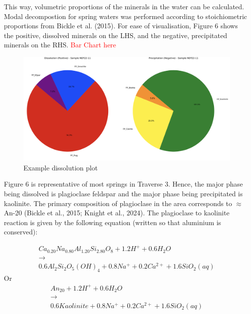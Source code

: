 This way, volumetric proportions of the minerals in the water can be calculated. Modal decompostion for spring waters was performed according to stoichiometric proportions from Bickle et al. (2015). For ease of visualisation, Figure 6 shows the positive, dissolved minerals on the LHS, and the negative, precipitated minerals on the RHS. \textcolor{red}{Bar Chart here}\\

\begin{figure}[h]
    \centering
    \includegraphics[width=\textwidth]{Stoichiometric_eg.png}
    \caption{Example dissolution plot}
    \label{fig:discussion6}
\end{figure}

\FloatBarrier

Figure 6 is representative of most springs in Traverse 3. Hence, the major phase being dissolved is plagioclase feldspar and the major phase being precipitated is kaolinite. The primary composition of plagioclase in the area corresponds to $\approx$ An-20 (Bickle et al., 2015; Knight et al., 2024).  The plagioclase to kaolinite reaction is given by the following equation (written so that aluminium is conserved):

\begin{equation}
    \begin{matrix}
Ca_{0.20}Na_{0.80}Al_{1.20}Si_{2.80}O_{8} + 1.2H^{+} + 0.6 H_{2}O \\ \rightarrow\\ 0.6 Al_{2}Si_{2}O_{5}(OH)_{4} + 0.8 Na^{+} + 0.2 Ca^{2+} + 1.6 SiO_{2}(aq)
    \end{matrix}
\end{equation}
\quad Or
\begin{equation}
    \begin{matrix}
An_{20} + 1.2 H^{+} + 0.6 H_{2}O\\ \rightarrow\\ 0.6 Kaolinite + 0.8 Na^{+} + 0.2 Ca^{2+} + 1.6 SiO_{2}(aq)
\end{matrix}
\label{eq:10}
\end{equation}\\




